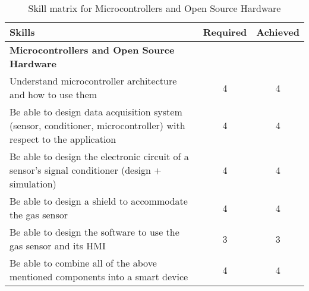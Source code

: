 \begin{table}[h!]
    \centering
    \renewcommand{\arraystretch}{1.5} %
    \begin{tabular}{|p{11cm}|c|c|}
    \hline
    \rowcolor[gray]{0.8}
    \textbf{Skills} & \textbf{Required} & \textbf{Achieved} \\ \hline
    \rowcolor[gray]{0.9} \textbf{Microcontrollers and Open Source Hardware} &  &  \\ \hline
    Understand microcontroller architecture and how to use them & 4 & 4 \\ \hline
    Be able to design data acquisition system (sensor, conditioner, microcontroller) with respect to the application & 4 & 4 \\ \hline
    Be able to design the electronic circuit of a sensor’s signal conditioner (design + simulation) & 4 & 4 \\ \hline
    Be able to design a shield to accommodate the gas sensor & 4 & 4 \\ \hline
    Be able to design the software to use the gas sensor and its HMI & 3 & 3 \\ \hline
    Be able to combine all of the above mentioned components into a smart device & 4 & 4 \\ \hline
    \end{tabular}
    \caption{Skill matrix for Microcontrollers and Open Source Hardware}
    \label{table:skills-microcontrollers}
\end{table}

